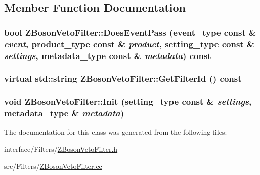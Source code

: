 \subsection{Member Function Documentation}
\hypertarget{classZBosonVetoFilter_a4a31bbec91004fcc89f1c1d131c57f65}{
\subsubsection[{DoesEventPass}]{\setlength{\rightskip}{0pt plus 5cm}bool ZBosonVetoFilter::DoesEventPass (event\_\-type const \& {\em event}, \/  product\_\-type const \& {\em product}, \/  setting\_\-type const \& {\em settings}, \/  metadata\_\-type const \& {\em metadata}) const}}
\label{classZBosonVetoFilter_a4a31bbec91004fcc89f1c1d131c57f65}
\hypertarget{classZBosonVetoFilter_a00f42a5e70a9c9e302655ce1cf355eb6}{
\subsubsection[{GetFilterId}]{\setlength{\rightskip}{0pt plus 5cm}virtual std::string ZBosonVetoFilter::GetFilterId () const}}
\label{classZBosonVetoFilter_a00f42a5e70a9c9e302655ce1cf355eb6}
\hypertarget{classZBosonVetoFilter_ab6e03e6480217f6345ffd7df2737f8b4}{
\subsubsection[{Init}]{\setlength{\rightskip}{0pt plus 5cm}void ZBosonVetoFilter::Init (setting\_\-type const \& {\em settings}, \/  metadata\_\-type \& {\em metadata})}}
\label{classZBosonVetoFilter_ab6e03e6480217f6345ffd7df2737f8b4}


The documentation for this class was generated from the following files:\begin{DoxyCompactItemize}
\item 
interface/Filters/\hyperlink{ZBosonVetoFilter_8h}{ZBosonVetoFilter.h}\item 
src/Filters/\hyperlink{ZBosonVetoFilter_8cc}{ZBosonVetoFilter.cc}\end{DoxyCompactItemize}
